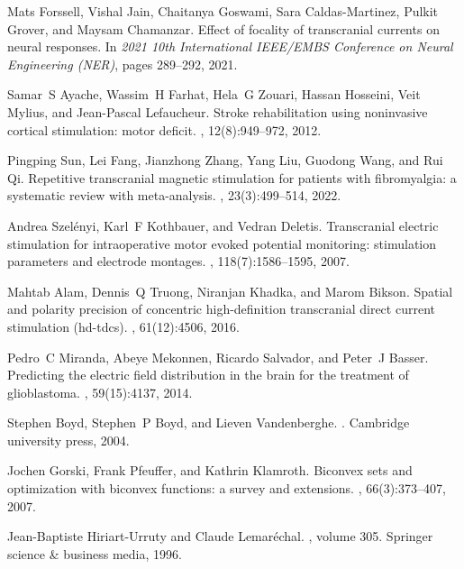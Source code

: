 \begin{thebibliography}{10}
Mats Forssell, Vishal Jain, Chaitanya Goswami, Sara Caldas-Martinez, Pulkit Grover, and Maysam Chamanzar.
\newblock Effect of focality of transcranial currents on neural responses.
\newblock In {\em 2021 10th International IEEE/EMBS Conference on Neural Engineering (NER)}, pages 289--292, 2021.

Samar~S Ayache, Wassim~H Farhat, Hela~G Zouari, Hassan Hosseini, Veit Mylius, and Jean-Pascal Lefaucheur.
\newblock Stroke rehabilitation using noninvasive cortical stimulation: motor deficit.
, 12(8):949--972, 2012.

Pingping Sun, Lei Fang, Jianzhong Zhang, Yang Liu, Guodong Wang, and Rui Qi.
\newblock Repetitive transcranial magnetic stimulation for patients with fibromyalgia: a systematic review with meta-analysis.
, 23(3):499--514, 2022.

Andrea Szel{\'e}nyi, Karl~F Kothbauer, and Vedran Deletis.
\newblock Transcranial electric stimulation for intraoperative motor evoked potential monitoring: stimulation parameters and electrode montages.
, 118(7):1586--1595, 2007.

Mahtab Alam, Dennis~Q Truong, Niranjan Khadka, and Marom Bikson.
\newblock Spatial and polarity precision of concentric high-definition transcranial direct current stimulation (hd-tdcs).
, 61(12):4506, 2016.

Pedro~C Miranda, Abeye Mekonnen, Ricardo Salvador, and Peter~J Basser.
\newblock Predicting the electric field distribution in the brain for the treatment of glioblastoma.
, 59(15):4137, 2014.

Stephen Boyd, Stephen~P Boyd, and Lieven Vandenberghe.
.
\newblock Cambridge university press, 2004.

Jochen Gorski, Frank Pfeuffer, and Kathrin Klamroth.
\newblock Biconvex sets and optimization with biconvex functions: a survey and extensions.
, 66(3):373--407, 2007.

Jean-Baptiste Hiriart-Urruty and Claude Lemar{\'e}chal.
, volume 305.
\newblock Springer science \& business media, 1996.


\end{thebibliography}
